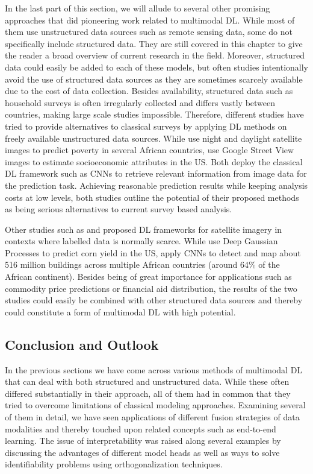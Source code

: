 \documentclass[
]{krantz}
\begin{document}
In the last part of this section, we will allude to several other promising approaches that did pioneering work related to multimodal DL. While most of them use unstructured data sources such as remote sensing data, some do not specifically include structured data. They are still covered in this chapter to give the reader a broad overview of current research in the field. Moreover, structured data could easily be added to each of these models, but often studies intentionally avoid the use of structured data sources as they are sometimes scarcely available due to the cost of data collection. Besides availability, structured data such as household surveys is often irregularly collected and differs vastly between countries, making large scale studies impossible. Therefore, different studies have tried to provide alternatives to classical surveys by applying DL methods on freely available unstructured data sources. While \citet{Jean2016} use night and daylight satellite images to predict poverty in several African countries, \citet{Gebru2017} use Google Street View images to estimate socioeconomic attributes in the US. Both deploy the classical DL framework such as CNNs to retrieve relevant information from image data for the prediction task. Achieving reasonable prediction results while keeping analysis costs at low levels, both studies outline the potential of their proposed methods as being serious alternatives to current survey based analysis.

Other studies such as \citet{DeepGPYou2017} and \citet{Sirko2021} proposed DL frameworks for satellite imagery in contexts where labelled data is normally scarce. While \citet{DeepGPYou2017} use Deep Gaussian Processes to predict corn yield in the US, \citet{Sirko2021} apply CNNs to detect and map about 516 million buildings across multiple African countries (around 64\% of the African continent). Besides being of great importance for applications such as commodity price predictions or financial aid distribution, the results of the two studies could easily be combined with other structured data sources and thereby could constitute a form of multimodal DL with high potential.

\hypertarget{conclusion-and-outlook}{%
\subsection{Conclusion and Outlook}\label{conclusion-and-outlook}}

In the previous sections we have come across various methods of multimodal DL that can deal with both structured and unstructured data. While these often differed substantially in their approach, all of them had in common that they tried to overcome limitations of classical modeling approaches. Examining several of them in detail, we have seen applications of different fusion strategies of data modalities and thereby touched upon related concepts such as end-to-end learning. The issue of interpretability was raised along several examples by discussing the advantages of different model heads as well as ways to solve identifiability problems using orthogonalization techniques.
\end{document}
